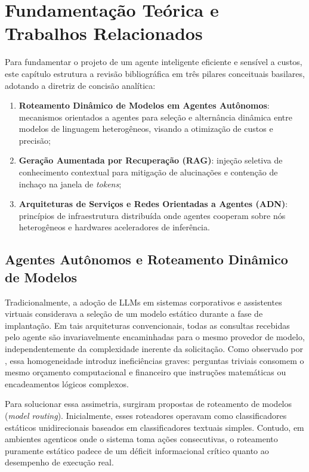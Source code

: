 \chapter{Fundamentação Teórica e Trabalhos Relacionados}\label{estadoDaArte}

Para fundamentar o projeto de um agente inteligente eficiente e sensível a custos, este capítulo estrutura a revisão bibliográfica em três pilares conceituais basilares, adotando a diretriz de concisão analítica:

\begin{enumerate}
    \item \textbf{Roteamento Dinâmico de Modelos em Agentes Autônomos}: mecanismos orientados a agentes para seleção e alternância dinâmica entre modelos de linguagem heterogêneos, visando a otimização de custos e precisão;
    \item \textbf{Geração Aumentada por Recuperação (RAG)}: injeção seletiva de conhecimento contextual para mitigação de alucinações e contenção de inchaço na janela de \textit{tokens};
    \item \textbf{Arquiteturas de Serviços e Redes Orientadas a Agentes (ADN)}: princípios de infraestrutura distribuída onde agentes cooperam sobre nós heterogêneos e hardwares aceleradores de inferência.
\end{enumerate}

\section{Agentes Autônomos e Roteamento Dinâmico de Modelos}

Tradicionalmente, a adoção de LLMs em sistemas corporativos e assistentes virtuais considerava a seleção de um modelo estático durante a fase de implantação. Em tais arquiteturas convencionais, todas as consultas recebidas pelo agente são invariavelmente encaminhadas para o mesmo provedor de modelo, independentemente da complexidade inerente da solicitação. Como observado por , essa homogeneidade introduz ineficiências graves: perguntas triviais consomem o mesmo orçamento computacional e financeiro que instruções matemáticas ou encadeamentos lógicos complexos.

Para solucionar essa assimetria, surgiram propostas de roteamento de modelos (\textit{model routing}). Inicialmente, esses roteadores operavam como classificadores estáticos unidirecionais baseados em classificadores textuais simples. Contudo, em ambientes agenticos onde o sistema toma ações consecutivas, o roteamento puramente estático padece de um déficit informacional crítico quanto ao desempenho de execução real.

